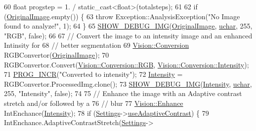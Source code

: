 \begin{DoxyCode}
60   \textcolor{keywordtype}{float} progstep = 1. / \textcolor{keyword}{static\_cast<}\textcolor{keywordtype}{float}\textcolor{keyword}{>}(totalsteps);
61 
62   \textcolor{keywordflow}{if} (\hyperlink{class_soil_analyzer_1_1_sample_a0d6e6fca9e232a77329daf0b4b29c634}{OriginalImage}.empty()) \{
63     \textcolor{keywordflow}{throw} Exception::AnalysisException(\textcolor{stringliteral}{"No Image found to analyze!"}, 1);
64   \}
65   \hyperlink{_vision_debug_8h_aae864fa4f990213a4184a209ff236202}{SHOW\_DEBUG\_IMG}(\hyperlink{class_soil_analyzer_1_1_sample_a0d6e6fca9e232a77329daf0b4b29c634}{OriginalImage}, \hyperlink{_soil_math_types_8h_a65f85814a8290f9797005d3b28e7e5fc}{uchar}, 255, \textcolor{stringliteral}{"RGB"}, \textcolor{keyword}{false});
66 
67   \textcolor{comment}{// Convert the image to an intensity image and an enhanced Intinsity for}
68   \textcolor{comment}{// better segmentation}
69   \hyperlink{class_vision_1_1_conversion}{Vision::Conversion} RGBConvertor(\hyperlink{class_soil_analyzer_1_1_sample_a0d6e6fca9e232a77329daf0b4b29c634}{OriginalImage});
70   RGBConvertor.Convert(\hyperlink{class_vision_1_1_conversion_a0a21d4ccbb013185f1974d35ec86e388af3fab43e1e6d8ffab1bf27050866a8d5}{Vision::Conversion::RGB}, 
      \hyperlink{class_vision_1_1_conversion_a0a21d4ccbb013185f1974d35ec86e388abfa5e56d2444f73ce850195468885fdd}{Vision::Conversion::Intensity});
71   \hyperlink{_sample_8h_a46c89e6320d3c886c2726161399fed91}{PROG\_INCR}(\textcolor{stringliteral}{"Converted to intensity"});
72   \hyperlink{class_soil_analyzer_1_1_soil_a6f56200f2722df5b849d8cddd094c852}{Intensity} = RGBConvertor.ProcessedImg.clone();
73   \hyperlink{_vision_debug_8h_aae864fa4f990213a4184a209ff236202}{SHOW\_DEBUG\_IMG}(\hyperlink{class_soil_analyzer_1_1_soil_a6f56200f2722df5b849d8cddd094c852}{Intensity}, \hyperlink{_soil_math_types_8h_a65f85814a8290f9797005d3b28e7e5fc}{uchar}, 255, \textcolor{stringliteral}{"Intensity"}, \textcolor{keyword}{false});
74 
75   \textcolor{comment}{// Enhance the image with an Adaptive contrast stretch and/or followed by a}
76   \textcolor{comment}{// blur}
77   \hyperlink{class_vision_1_1_enhance}{Vision::Enhance} IntEnchance(\hyperlink{class_soil_analyzer_1_1_soil_a6f56200f2722df5b849d8cddd094c852}{Intensity});
78   \textcolor{keywordflow}{if} (\hyperlink{class_soil_analyzer_1_1_sample_a31f7b29fc46497f9b2847285c7893832}{Settings}->\hyperlink{class_soil_analyzer_1_1_soil_settings_a0e27335d05aed8f3f084744062368578}{useAdaptiveContrast}) \{
79     IntEnchance.AdaptiveContrastStretch(\hyperlink{class_soil_analyzer_1_1_sample_a31f7b29fc46497f9b2847285c7893832}{Settings}->

\end{DoxyCode}
